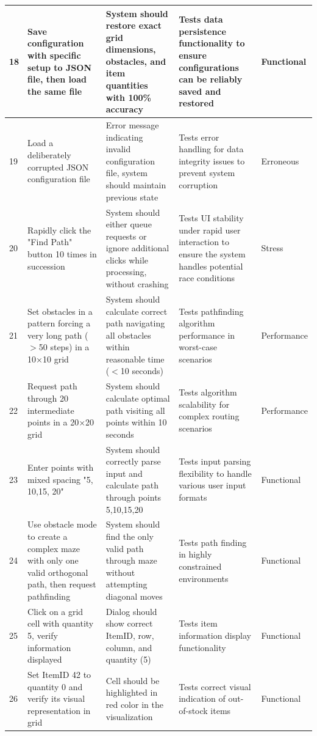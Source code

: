 \begin{longtable}{|p{}|p{}|p{}|p{}|p{}|}
\hline
18 & Save configuration with specific setup to JSON file, then load the same file & System should restore exact grid dimensions, obstacles, and item quantities with 100\% accuracy & Tests data persistence functionality to ensure configurations can be reliably saved and restored & Functional \\
\hline
19 & Load a deliberately corrupted JSON configuration file & Error message indicating invalid configuration file, system should maintain previous state & Tests error handling for data integrity issues to prevent system corruption & Erroneous \\
\hline
20 & Rapidly click the "Find Path" button 10 times in succession & System should either queue requests or ignore additional clicks while processing, without crashing & Tests UI stability under rapid user interaction to ensure the system handles potential race conditions & Stress \\
\hline
21 & Set obstacles in a pattern forcing a very long path ($>$50 steps) in a 10×10 grid & System should calculate correct path navigating all obstacles within reasonable time ($<$10 seconds) & Tests pathfinding algorithm performance in worst-case scenarios & Performance \\
\hline
22 & Request path through 20 intermediate points in a 20×20 grid & System should calculate optimal path visiting all points within 10 seconds & Tests algorithm scalability for complex routing scenarios & Performance \\
\hline
23 & Enter points with mixed spacing "5, 10,15, 20" & System should correctly parse input and calculate path through points 5,10,15,20 & Tests input parsing flexibility to handle various user input formats & Functional \\
\hline
24 & Use obstacle mode to create a complex maze with only one valid orthogonal path, then request pathfinding & System should find the only valid path through maze without attempting diagonal moves & Tests path finding in highly constrained environments & Functional \\
\hline
25 & Click on a grid cell with quantity 5, verify information displayed & Dialog should show correct ItemID, row, column, and quantity (5) & Tests item information display functionality & Functional \\
\hline
26 & Set ItemID 42 to quantity 0 and verify its visual representation in grid & Cell should be highlighted in red color in the visualization & Tests correct visual indication of out-of-stock items & Functional \\

\end{longtable}
